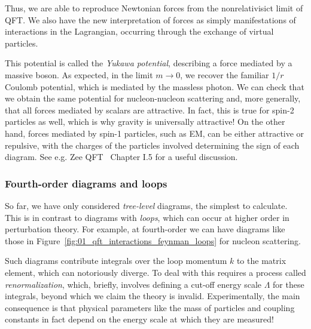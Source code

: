 Thus, we are able to reproduce Newtonian forces from the nonrelativisict limit of QFT.
We also have the new interpretation of forces as simply manifestations of interactions in the Lagrangian, occurring through the exchange of virtual particles.

This potential is called the \textit{Yukawa potential}, describing a force mediated by a massive boson.
As expected, in the limit $m \rightarrow 0$, we recover the familiar $1/r$ Coulomb potential, which is mediated by the massless photon.
We can check that we obtain the same potential for nucleon-nucleon scattering and, more generally, that all forces mediated by scalars are attractive.
In fact, this is true for spin-2 particles as well, which is why gravity is universally attractive!
On the other hand, forces mediated by spin-1 particles, such as EM, can be either attractive or repulsive, with the charges of the particles involved determining the sign of each diagram.
See e.g. Zee QFT~\cite{Zee:2003mt} Chapter I.5 for a useful discussion.

\subsubsection{Fourth-order diagrams and loops}

So far, we have only considered \textit{tree-level} diagrams, the simplest to calculate.
This is in contrast to diagrams with \textit{loops}, which can occur at higher order in perturbation theory.
For example, at fourth-order we can have diagrams like those in Figure~\ref{fig:01_qft_interactions_feynman_loops} for nucleon scattering. 

Such diagrams contribute integrals over the loop momentum $k$ to the matrix element, which can notoriously diverge.
To deal with this requires a process called \textit{renormalization}, which, briefly, involves defining a cut-off energy scale $\Lambda$ for these integrals, beyond which we claim the theory is invalid.
Experimentally, the main consequence is that physical parameters like the mass of particles and coupling constants in fact depend on the energy scale at which they are measured!


